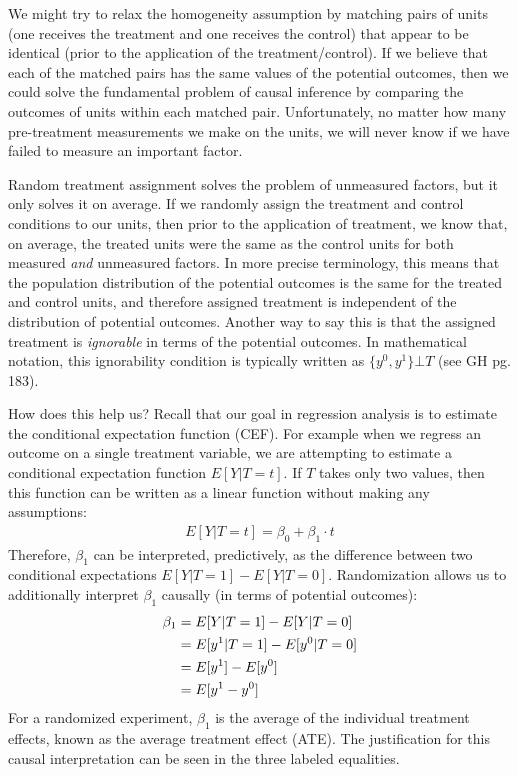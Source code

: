\documentclass{article}
\begin{document}
We might try to relax the homogeneity assumption by matching pairs of units (one receives the treatment and one receives the control) that appear to be identical (prior to the application of the treatment/control). If we believe that each of the matched pairs has the same values of the potential outcomes, then we could solve the fundamental problem of causal inference by comparing the outcomes of units within each matched pair. Unfortunately, no matter how many pre-treatment measurements we make on the units, we will never know if we have failed to measure an important factor.  

Random treatment assignment solves the problem of unmeasured factors, but it only solves it on average. If we randomly assign the treatment and control conditions to our units, then prior to the application of treatment, we know that, on average, the treated units were the same as the control units for both measured \emph{and} unmeasured factors. In more precise terminology, this means that the population distribution of the potential outcomes is the same for the treated and control units, and therefore assigned treatment is independent of the distribution of potential outcomes. Another way to say this is that the assigned treatment is \emph{ignorable} in terms of the potential outcomes. In mathematical notation, this ignorability condition is typically written as $\{y^0,y^1\} \bot T$ (see GH pg. 183). 

How does this help us? Recall that our goal in regression analysis is to estimate the conditional expectation function (CEF). For example when we regress an outcome on a single treatment variable, we are attempting to estimate a conditional expectation function $E[Y|T=t]$. If $T$ takes only two values, then this function can be written as a linear function without making any assumptions:
\begin{align*}
E[Y|T=t] = \beta_0 + \beta_1 \cdot t
\end{align*}
Therefore, $\beta_1$ can be interpreted, predictively, as the difference between two conditional expectations $E[Y|T=1]-E[Y|T=0]$. Randomization allows us to additionally interpret $\beta_1$ causally (in terms of potential outcomes): 
\begin{align}
\beta_1 &= E[Y|T=1]-E[Y|T=0] \notag\\
&= E[y^1|T=1]-E[y^0|T=0] \label{eq:consistency}\\
&= E[y^1]-E[y^0] \label{eq:ignore}\\
&= E[y^1-y^0] \label{eq:propExp}
\end{align}
For a randomized experiment, $\beta_1$ is the average of the individual treatment effects, known as the average treatment effect (ATE). The justification for this causal interpretation can be seen in the three labeled equalities.
\end{document}
